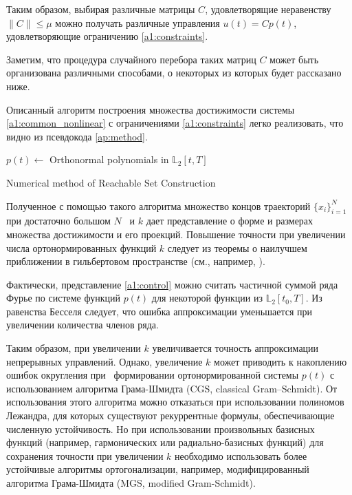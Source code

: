 \documentclass[../main.tex]{subfiles}
\begin{document}
  Таким образом, выбирая различные матрицы $C$, удовлетворящие неравенству $\| C\| \leqslant \mu $ можно получать различные управления $u(t) = C p(t)$, удовлетворяющие ограничению \eqref{a1:constraints}.
  
  Заметим, что процедура случайного перебора таких матриц $C$ может быть организована различными способами, о некоторых из которых будет рассказано ниже.
  
  Описанный алгоритм построения множества достижимости системы \eqref{a1:common_nonlinear} с ограничениями \eqref{a1:constraints} легко реализовать, что видно из псевдокода \ref{ap:method}.
  \begin{algorithm}[hbt!]
  	$p(t) \gets $ Orthonormal polynomials in $\mathbb{L}_2[t,T]$ \;
  	\caption{Numerical method of Reachable Set Construction}
  	 \label{ap:method}
  \end{algorithm}
  
  Полученное с помощью такого алгоритма множество концов траекторий $\{x_i\}_{i = 1}^{N}$ при достаточно большом $N$  и $k$ дает представление о форме и размерах множества достижимости и его проекций. 
  Повышение точности при увеличении числа ортонормированных функций $k$ следует из теоремы о наилучшем приближении в гильбертовом пространстве (см., например, \cite{Kolmogorov}). 
  
  Фактически, представление \eqref{a1:control} можно считать частичной суммой ряда Фурье по системе функций $p(t)$ для некоторой функции из $\mathbb{L}_2[t_0, {T}]$. 
  Из равенства Бесселя следует, что ошибка аппроксимации уменьшается при увеличении количества членов ряда. 
  
  Таким образом, при увеличении $k$ увеличивается точность аппроксимации непрерывных управлений. 
  Однако, увеличение $k$ может приводить к накоплению ошибок округления при  формировании ортонормированной системы $p(t)$ с использованием алгоритма Грама-Шмидта (CGS, classical Gram–Schmidt). 
  От использования этого алгоритма можно отказаться при использовании полиномов Лежандра, для которых существуют рекуррентные формулы, обеспечивающие численную устойчивость. 
  Но при использовании произвольных базисных функций (например, гармонических или радиально-базисных функций) для сохранения точности при увеличении $k$ необходимо использовать более устойчивые алгоритмы ортогонализации, например, модифицированный алгоритма  Грама-Шмидта (MGS, modified Gram-Schmidt).
  
\end{document}
